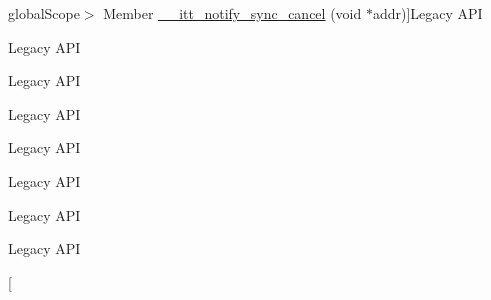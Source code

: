 \begin{DoxyRefList}
global\+Scope$>$ Member \hyperlink{group__legacy__sync_gacf148cea40415abcee401dfd43d8a5c1}{\+\_\+\+\_\+itt\+\_\+notify\+\_\+sync\+\_\+cancel} (void $\ast$addr)]Legacy A\+P\+I  
\item[\label{deprecated__deprecated000009}%
\hypertarget{deprecated__deprecated000009}{}%
global\+Scope$>$ Member \hyperlink{group__legacy__sync_gaa9a3eba5828bf261c60fc84e23c98ae1}{\+\_\+\+\_\+itt\+\_\+notify\+\_\+sync\+\_\+name\+A} (void $\ast$addr, const char $\ast$objtype, int typelen, const char $\ast$objname, int namelen, int attribute)]Legacy A\+P\+I  
\item[\label{deprecated__deprecated000010}%
\hypertarget{deprecated__deprecated000010}{}%
global\+Scope$>$ Member \hyperlink{group__legacy__sync_gac02b12fb980d0edc058b280a512f9b4c}{\+\_\+\+\_\+itt\+\_\+notify\+\_\+sync\+\_\+prepare} (void $\ast$addr)]Legacy A\+P\+I  
\item[\label{deprecated__deprecated000013}%
\hypertarget{deprecated__deprecated000013}{}%
global\+Scope$>$ Member \hyperlink{group__legacy__sync_ga6235d3f0e928b27b3fa2ac8e707f4735}{\+\_\+\+\_\+itt\+\_\+notify\+\_\+sync\+\_\+releasing} (void $\ast$addr)]Legacy A\+P\+I  
\item[\label{deprecated__deprecated000020}%
\hypertarget{deprecated__deprecated000020}{}%
global\+Scope$>$ Member \hyperlink{legacy_2ittnotify_8h_a5a5ed47978780e8c7a2d8eeb6accd98f}{\+\_\+\+\_\+itt\+\_\+obj\+\_\+mode\+\_\+set} (\+\_\+\+\_\+itt\+\_\+obj\+\_\+prop\+\_\+t p, \+\_\+\+\_\+itt\+\_\+obj\+\_\+state\+\_\+t s)]Legacy A\+P\+I  
\item[\label{deprecated__deprecated000017}%
\hypertarget{deprecated__deprecated000017}{}%
global\+Scope$>$ Member \hyperlink{legacy_2ittnotify_8h_a2034eb8dd62df94db4437af7dd2a478d}{\+\_\+\+\_\+itt\+\_\+state\+\_\+get} (void)]Legacy A\+P\+I  
\item[\label{deprecated__deprecated000018}%
\hypertarget{deprecated__deprecated000018}{}%
global\+Scope$>$ Member \hyperlink{legacy_2ittnotify_8h_aea4dd5bc719d76ea354b3beb8308a35c}{\+\_\+\+\_\+itt\+\_\+state\+\_\+set} (\+\_\+\+\_\+itt\+\_\+state\+\_\+t s)]Legacy A\+P\+I  
\item[\label{deprecated__deprecated000008}%
\hypertarget{deprecated__deprecated000008}{}%
global\+Scope$>$ Member \hyperlink{group__legacy__sync_ga8e63e2fa02de5df802490554d8ff0a41}{\+\_\+\+\_\+itt\+\_\+sync\+\_\+set\+\_\+name\+A} (void $\ast$addr, const char $\ast$objtype, const char $\ast$objname, int attribute)]Legacy A\+P\+I  
\item[\label{deprecated__deprecated000007}%

\end{DoxyRefList}
